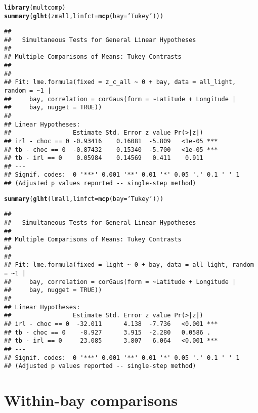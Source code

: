 \documentclass[letterpaper,12pt]{article}\usepackage[]{graphicx}\usepackage[]{color}
\makeatletter
\newcommand{\hlstr}[1]{\textcolor[rgb]{0.192,0.494,0.8}{#1}}%
\newcommand{\hlstd}[1]{\textcolor[rgb]{0.345,0.345,0.345}{#1}}%
\newcommand{\hlkwc}[1]{\textcolor[rgb]{0.333,0.667,0.333}{#1}}%
\newcommand{\hlkwd}[1]{\textcolor[rgb]{0.737,0.353,0.396}{\textbf{#1}}}%
\newenvironment{kframe}{%
 \def\at@end@of@kframe{}%
 \ifinner\ifhmode%
  \def\at@end@of@kframe{\end{minipage}}%
  \begin{minipage}{\columnwidth}%
 \fi\fi%
 \def\FrameCommand##1{\hskip\@totalleftmargin \hskip-\fboxsep
 \colorbox{shadecolor}{##1}\hskip-\fboxsep
     \hskip-\linewidth \hskip-\@totalleftmargin \hskip\columnwidth}%
 \MakeFramed {\advance\hsize-\width
   \@totalleftmargin\z@ \linewidth\hsize
   \@setminipage}}%
 {\par\unskip\endMakeFramed%
 \at@end@of@kframe}
\newenvironment{knitrout}{}{} %
\makeatother
\begin{document}
\begin{knitrout}
\color{fgcolor}\begin{kframe}
\begin{alltt}
\hlkwd{library}\hlstd{(multcomp)}
\hlkwd{summary}\hlstd{(}\hlkwd{glht}\hlstd{(zmall,} \hlkwc{linfct} \hlstd{=} \hlkwd{mcp}\hlstd{(}\hlkwc{bay} \hlstd{=} \hlstr{'Tukey'}\hlstd{)))}
\end{alltt}
\begin{verbatim}
## 
## 	 Simultaneous Tests for General Linear Hypotheses
## 
## Multiple Comparisons of Means: Tukey Contrasts
## 
## 
## Fit: lme.formula(fixed = z_c_all ~ 0 + bay, data = all_light, random = ~1 | 
##     bay, correlation = corGaus(form = ~Latitude + Longitude | 
##     bay, nugget = TRUE))
## 
## Linear Hypotheses:
##                 Estimate Std. Error z value Pr(>|z|)    
## irl - choc == 0 -0.93416    0.16081  -5.809   <1e-05 ***
## tb - choc == 0  -0.87432    0.15340  -5.700   <1e-05 ***
## tb - irl == 0    0.05984    0.14569   0.411    0.911    
## ---
## Signif. codes:  0 '***' 0.001 '**' 0.01 '*' 0.05 '.' 0.1 ' ' 1
## (Adjusted p values reported -- single-step method)
\end{verbatim}
\begin{alltt}
\hlkwd{summary}\hlstd{(}\hlkwd{glht}\hlstd{(lmall,} \hlkwc{linfct} \hlstd{=} \hlkwd{mcp}\hlstd{(}\hlkwc{bay} \hlstd{=} \hlstr{'Tukey'}\hlstd{)))}
\end{alltt}
\begin{verbatim}
## 
## 	 Simultaneous Tests for General Linear Hypotheses
## 
## Multiple Comparisons of Means: Tukey Contrasts
## 
## 
## Fit: lme.formula(fixed = light ~ 0 + bay, data = all_light, random = ~1 | 
##     bay, correlation = corGaus(form = ~Latitude + Longitude | 
##     bay, nugget = TRUE))
## 
## Linear Hypotheses:
##                 Estimate Std. Error z value Pr(>|z|)    
## irl - choc == 0  -32.011      4.138  -7.736   <0.001 ***
## tb - choc == 0    -8.927      3.915  -2.280   0.0586 .  
## tb - irl == 0     23.085      3.807   6.064   <0.001 ***
## ---
## Signif. codes:  0 '***' 0.001 '**' 0.01 '*' 0.05 '.' 0.1 ' ' 1
## (Adjusted p values reported -- single-step method)
\end{verbatim}
\end{kframe}
\end{knitrout}

\section{Within-bay comparisons}
\end{document}
